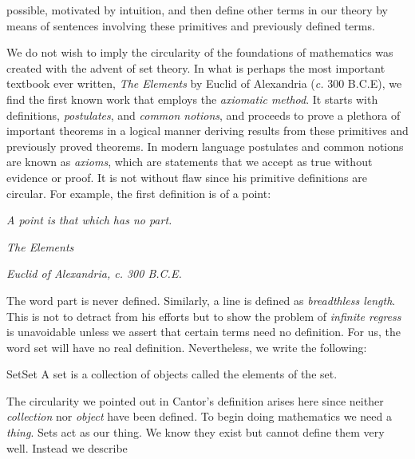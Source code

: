        possible, motivated by intuition, and then define other terms in our
        theory by means of sentences involving these primitives and previously
        defined terms.
        \par\hfill\par
        We do not wish to imply the circularity of the foundations of
        mathematics was created with the advent of set theory. In what is
        perhaps the most important textbook ever written,
        \textit{The Elements} by Euclid of
        Alexandria (\textit{c.} 300 B.C.E), we find the first known work
        that employs the \textit{axiomatic method}. It
        starts with definitions, \textit{postulates}, and
        \textit{common notions}, and proceeds to prove a plethora of important
        theorems in a logical manner deriving results from these primitives and
        previously proved theorems. In modern language postulates and common
        notions are known as \textit{axioms}, which are statements that we
        accept as true without evidence or proof. It is not without flaw since
        his primitive definitions are circular. For example, the
        first definition is of a point:
        \begin{center}
            \textit{A point is that which has no part.}
            \par
            \hfill\textit{The Elements}\par
            \hfill\textit{Euclid of Alexandria, c. 300 B.C.E.}
        \end{center}
        The word part is never defined. Similarly, a line is defined as
        \textit{breadthless length}. This is not to detract from his efforts but
        to show the problem of \textit{infinite regress}
        is unavoidable unless we assert that certain terms need no definition.
        For us, the word set will have no real definition. Nevertheless, we
        write the following:
        \begin{fdefinition}{Set}{Set}
            A \gls{set} is a collection of objects called the elements of the
            set.
        \end{fdefinition}
        The circularity we pointed out in Cantor's definition arises here since
        neither \textit{collection} nor \textit{object} have been defined. To
        begin doing mathematics we need a \textit{thing}. Sets act as our thing.
        We know they exist but cannot define them very well. Instead we describe
